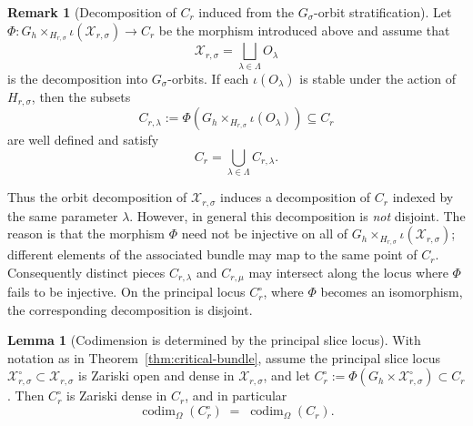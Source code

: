 \documentclass{article}
\newcommand{\codim}{\operatorname{codim}}
\theoremstyle{definition}
\newtheorem{lemma}[theorem]{Lemma}
\newtheorem{remark}[theorem]{Remark}
\begin{document}
\begin{remark}[Decomposition of $C_r$ induced from the $G_\sigma$-orbit stratification]
\label{rem:Cr-decomposition}
Let $\Phi : G_h \times_{H_{r,\sigma}} \iota(\mathcal X_{r,\sigma}) \to C_r$ be the morphism introduced above and assume that
\[
\mathcal X_{r,\sigma}=\bigsqcup_{\lambda\in\Lambda} O_\lambda
\]
is the decomposition into $G_\sigma$-orbits. If each $\iota(O_\lambda)$ is stable under the action of $H_{r,\sigma}$, then the subsets
\[
C_{r,\lambda} := \Phi\!\left(G_h \times_{H_{r,\sigma}} \iota(O_\lambda)\right) \subseteq C_r
\]
are well defined and satisfy
\[
C_r = \bigcup_{\lambda\in\Lambda} C_{r,\lambda}.
\]

Thus the orbit decomposition of $\mathcal X_{r,\sigma}$ induces a decomposition of $C_r$ indexed by the same parameter $\lambda$. However, in general this decomposition is \emph{not} disjoint. The reason is that the morphism $\Phi$ need not be injective on all of $G_h \times_{H_{r,\sigma}} \iota(\mathcal X_{r,\sigma})$; different elements of the associated bundle may map to the same point of $C_r$. Consequently distinct pieces $C_{r,\lambda}$ and $C_{r,\mu}$ may intersect along the locus where $\Phi$ fails to be injective. On the principal locus $C_r^\circ$, where $\Phi$ becomes an isomorphism, the corresponding decomposition is disjoint.
\end{remark}
\begin{lemma}[Codimension is determined by the principal slice locus]
\label{lem:codim-principal-locus}
With notation as in Theorem~\ref{thm:critical-bundle}, assume the principal slice locus
$\mathcal X_{r,\sigma}^{\circ}\subset \mathcal X_{r,\sigma}$ is Zariski open and dense in $\mathcal X_{r,\sigma}$, and let
$C_r^{\circ}:=\Phi(G_h\times \mathcal X_{r,\sigma}^{\circ})\subset C_r$.
Then $C_r^{\circ}$ is Zariski dense in $C_r$, and in particular
\[
\codim_{\Omega}(C_r^{\circ}) \;=\; \codim_{\Omega}(C_r).
\]
\end{lemma}
\end{document}
